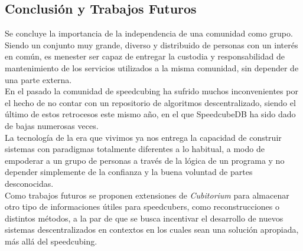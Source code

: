 \begin{multicols}{2}
\section{Conclusión y Trabajos Futuros}

Se concluye la importancia de la independencia de una comunidad como grupo. Siendo un conjunto muy grande, diverso y distribuido de personas con un interés en común, es menester ser capaz de entregar la custodia y responsabilidad de mantenimiento de los servicios utilizados a la misma comunidad, sin depender de una parte externa.\\

En el pasado la comunidad de speedcubing ha sufrido muchos inconvenientes por el hecho de no contar con un repositorio de algoritmos descentralizado, siendo el último de estos retrocesos este mismo año, en el que SpeedcubeDB ha sido dado de bajas numerosas veces.\\

La tecnología de la era que vivimos ya nos entrega la capacidad de construir sistemas con paradigmas totalmente diferentes a lo habitual, a modo de empoderar a un grupo de personas a través de la lógica de un programa y no depender simplemente de la confianza y la buena voluntad de partes desconocidas.\\

Como trabajos futuros se proponen extensiones de \textit{Cubitorium} para almacenar otro tipo de informaciones útiles para speedcubers, como reconstrucciones o distintos métodos, a la par de que se busca incentivar el desarrollo de nuevos sistemas descentralizados en contextos en los cuales sean una solución apropiada, más allá del speedcubing.







\end{multicols}

